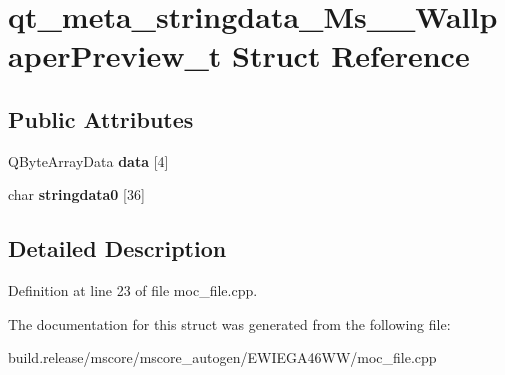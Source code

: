 \hypertarget{structqt__meta__stringdata___ms_____wallpaper_preview__t}{}\section{qt\+\_\+meta\+\_\+stringdata\+\_\+\+Ms\+\_\+\+\_\+\+Wallpaper\+Preview\+\_\+t Struct Reference}
\label{structqt__meta__stringdata___ms_____wallpaper_preview__t}
\subsection*{Public Attributes}
\begin{DoxyCompactItemize}
\item 
\mbox{\label{structqt__meta__stringdata___ms_____wallpaper_preview__t_a6a29044eeabcb69dc9306e0f4bf5aa22}} 
Q\+Byte\+Array\+Data {\bfseries data} \mbox{[}4\mbox{]}
\item 
\mbox{\label{structqt__meta__stringdata___ms_____wallpaper_preview__t_af3cbc7a6927b7c70e0cc7d7647df436f}} 
char {\bfseries stringdata0} \mbox{[}36\mbox{]}
\end{DoxyCompactItemize}


\subsection{Detailed Description}


Definition at line 23 of file moc\+\_\+file.\+cpp.



The documentation for this struct was generated from the following file\+:\begin{DoxyCompactItemize}
\item 
build.\+release/mscore/mscore\+\_\+autogen/\+E\+W\+I\+E\+G\+A46\+W\+W/moc\+\_\+file.\+cpp\end{DoxyCompactItemize}

